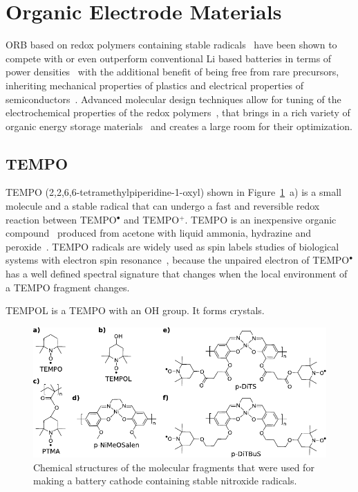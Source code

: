 \section{Organic Electrode Materials}
ORB based on redox polymers containing stable radicals~\cite{nakahara2002_cpl} have been shown to compete with or even outperform  conventional Li based batteries in terms of power densities~\cite{IWASA2007} with the additional benefit of being free from rare precursors, inheriting mechanical properties of plastics and electrical properties of semiconductors~\cite{friebe2017_topcurrchem,Casado2021,Goujon2021}. Advanced molecular design techniques allow for tuning of the electrochemical properties of the redox polymers~\cite{Janoschka2017}, that brings in a rich variety of organic energy storage materials~\cite{Xie2021,Vereshchagin2022,Janoschka2017a} and creates a large room for their optimization. 

\par
\subsection{TEMPO}
TEMPO (2,2,6,6-tetramethylpiperidine-1-oxyl) shown in Figure~\ref{fig:molecules}~a) is a small molecule and a stable radical that can undergo a fast and reversible redox reaction between TEMPO$^\bullet$ and TEMPO$^+$. TEMPO is an inexpensive organic compound~\cite{Vereshchagin2022} produced from acetone with liquid ammonia, hydrazine and peroxide~\cite{Casado_2021_book}. TEMPO radicals are widely used as spin labels studies of biological systems with electron spin resonance~\cite{emagres}, because the unpaired electron of TEMPO$^\bullet$ has a well defined spectral signature that changes when the local environment of a TEMPO fragment changes.

TEMPOL is a TEMPO with an OH group. It forms crystals.

\begin{figure}[h]
\center
	\includegraphics[width=1\textwidth]{./electrochemistry/figures/materials/molecules.pdf}
	\caption{Chemical structures of the molecular fragments that were used for making a battery cathode containing stable nitroxide radicals.}
	\label{fig:molecules}
\end{figure}



